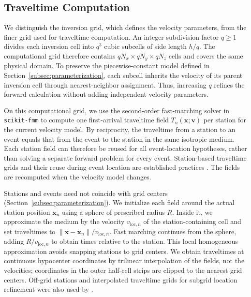 \documentclass[12pt, a4paper]{article}
\begin{document}
\subsection{Traveltime Computation}
\label{subsec:forward}

We distinguish the inversion grid, which defines the velocity parameters, from the finer grid used for traveltime computation. An integer subdivision factor $q\geq1$ divides each inversion cell into $q^3$ cubic subcells of side length $h/q$. The computational grid therefore contains $qN_x\times qN_y\times qN_z$ cells and covers the same physical domain. To preserve the piecewise-constant model defined in Section~\ref{subsec:parameterization}, each subcell inherits the velocity of its parent inversion cell through nearest-neighbor assignment. Thus, increasing $q$ refines the forward calculation without adding independent velocity parameters.

On this computational grid, we use the second-order fast-marching solver in \texttt{scikit-fmm} \parencite{scikitfmm} to compute one first-arrival traveltime field $T_n(\mathbf x;\mathbf v)$ per station for the current velocity model. By reciprocity, the traveltime from a station to an event equals that from the event to the station in the same isotropic medium. Each station field can therefore be reused for all event-location hypotheses, rather than solving a separate forward problem for every event. Station-based traveltime grids and their reuse during event location are established practices \parencite{lomax2000}. The fields are recomputed when the velocity model changes.

Stations and events need not coincide with grid centers (Section~\ref{subsec:parameterization}). We initialize each field around the actual station position $\mathbf x_n$ using a sphere of prescribed radius $R$. Inside it, we approximate the medium by the velocity $v_{\mathrm{loc},n}$ of the station-containing cell and set traveltimes to $\lVert\mathbf x-\mathbf x_n\rVert/v_{\mathrm{loc},n}$. Fast marching continues from the sphere, adding $R/v_{\mathrm{loc},n}$ to obtain times relative to the station. This local homogeneous approximation avoids snapping stations to grid centers. We obtain traveltimes at continuous hypocenter coordinates by trilinear interpolation of the fields, not the velocities; coordinates in the outer half-cell strips are clipped to the nearest grid centers. Off-grid stations and interpolated traveltime grids for subgrid location refinement were also used by \textcite{wittlinger1993}.
\end{document}

